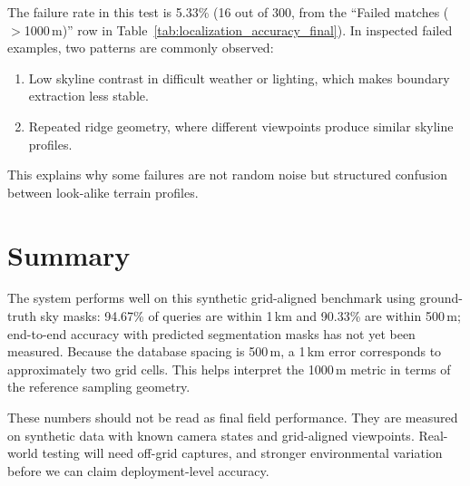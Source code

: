 The failure rate in this test is 5.33\% (16 out of 300, from the ``Failed matches ($>$1000\,m)'' row in Table~\ref{tab:localization_accuracy_final}). In inspected failed examples, two patterns are commonly observed:

\begin{enumerate}
\item Low skyline contrast in difficult weather or lighting, which makes boundary extraction less stable.
\item Repeated ridge geometry, where different viewpoints produce similar skyline profiles.
\end{enumerate}

This explains why some failures are not random noise but structured confusion between look-alike terrain profiles.

\section{Summary}

The system performs well on this synthetic grid-aligned benchmark using ground-truth sky masks: 94.67\% of queries are within 1\,km and 90.33\% are within 500\,m; end-to-end accuracy with predicted segmentation masks has not yet been measured.
Because the database spacing is 500\,m, a 1\,km error corresponds to approximately two grid cells.
This helps interpret the 1000\,m metric in terms of the reference sampling geometry.

These numbers should not be read as final field performance. They are measured on synthetic data with known camera states and grid-aligned viewpoints. Real-world testing will need off-grid captures, and stronger environmental variation before we can claim deployment-level accuracy.
